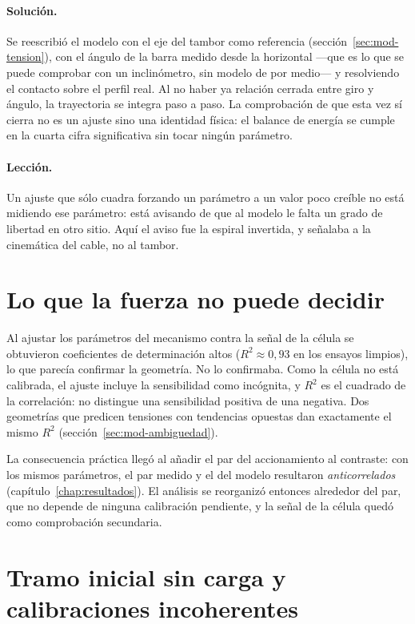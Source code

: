 \paragraph{Solución.} Se reescribió el modelo con el eje del tambor como referencia
(sección~\ref{sec:mod-tension}), con el ángulo de la barra medido desde la horizontal ---que es lo
que se puede comprobar con un inclinómetro, sin modelo de por medio--- y resolviendo el contacto
sobre el perfil real. Al no haber ya relación cerrada entre giro y ángulo, la trayectoria se integra
paso a paso. La comprobación de que esta vez sí cierra no es un ajuste sino una identidad física: el
balance de energía se cumple en la cuarta cifra significativa sin tocar ningún parámetro.

\paragraph{Lección.} Un ajuste que sólo cuadra forzando un parámetro a un valor poco creíble no está
midiendo ese parámetro: está avisando de que al modelo le falta un grado de libertad en otro sitio.
Aquí el aviso fue la espiral invertida, y señalaba a la cinemática del cable, no al tambor.

\section{Lo que la fuerza no puede decidir}
\label{sec:prob-signo}

Al ajustar los parámetros del mecanismo contra la señal de la célula se obtuvieron coeficientes de
determinación altos ($R^2 \approx 0{,}93$ en los ensayos limpios), lo que parecía confirmar la
geometría. No lo confirmaba. Como la célula no está calibrada, el ajuste incluye la sensibilidad
como incógnita, y $R^2$ es el cuadrado de la correlación: no distingue una sensibilidad positiva de
una negativa. Dos geometrías que predicen tensiones con tendencias opuestas dan exactamente el mismo
$R^2$ (sección~\ref{sec:mod-ambiguedad}).

La consecuencia práctica llegó al añadir el par del accionamiento al contraste: con los mismos
parámetros, el par medido y el del modelo resultaron \emph{anticorrelados}
(capítulo~\ref{chap:resultados}). El análisis se reorganizó entonces alrededor del par, que no
depende de ninguna calibración pendiente, y la señal de la célula quedó como comprobación
secundaria.

\section{Tramo inicial sin carga y calibraciones incoherentes}

